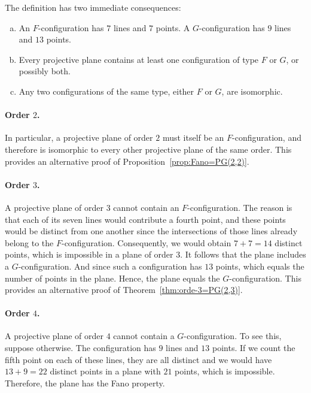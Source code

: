 \begin{rem}\label{rem:F-G-configurations}
    The definition has two immediate consequences:  
    \begin{enumerate}[a),font=\upshape]
        \item An $F$-configuration has $7$ lines and $7$ points. A $G$-configuration has $9$ lines and $13$ points.
        \item Every projective plane contains at least one configuration of type $F$ or $G$, or possibly both.  
        \item Any two configurations of the same type, either $F$ or $G$, are isomorphic.  
    \end{enumerate}  
    \paragraph{Order $2$.} In particular, a projective plane of order $2$ must itself be an $F$-configuration, and therefore is isomorphic to every other projective plane of the same order. This provides an alternative proof of Proposition~\ref{prop:Fano=PG(2,2)}.

    \paragraph{Order $3$.} A projective plane of order $3$ cannot contain an $F$-configuration. The reason is that each of its seven lines would contribute a fourth point, and these points would be distinct from one another since the intersections of those lines already belong to the $F$-configuration. Consequently, we would obtain $7+7=14$ distinct points, which is impossible in a plane of order $3$. It follows that the plane includes a $G$-configuration. And since such a configuration has $13$ points, which equals the number of points in the plane. Hence, the plane equals the $G$-configuration. This provides an alternative proof of Theorem~\ref{thm:orde-3=PG(2,3)}.

    \paragraph{Order $4$.} A projective plane of order $4$ cannot contain a $G$-configuration. To see this, suppose otherwise. The configuration has $9$ lines and $13$ points. If we count the fifth point on each of these lines, they are all distinct and we would have $13+9=22$ distinct points in a plane with $21$ points, which is impossible. Therefore, the plane has the Fano property.


\end{rem}
